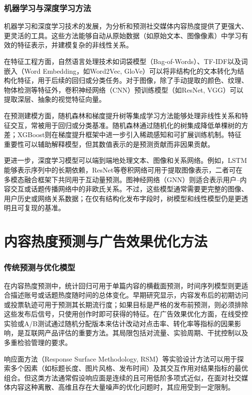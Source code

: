 \subsubsection{机器学习与深度学习方法}
机器学习和深度学习技术的发展，为分析和预测社交媒体内容热度提供了更强大、更灵活的工具。这些方法能够自动从原始数据（如原始文本、图像像素）中学习有效的特征表示，并建模复杂的非线性关系。

在特征工程方面，自然语言处理技术如词袋模型（Bag-of-Words）、TF-IDF以及词嵌入（Word Embedding，如Word2Vec, GloVe）可以将非结构化的文本转化为结构化特征，用于后续的回归或分类任务。对于图像，除了手动提取的颜色、纹理、物体检测等特征外，卷积神经网络（CNN）预训练模型（如ResNet, VGG）可以提取深层、抽象的视觉特征向量。

在预测建模方面，随机森林和梯度提升树等集成学习方法能够处理非线性关系和特征交互，常被用于回归或分类基准。随机森林通过随机化的树集成降低单棵树的方差\cite{Breiman2001}；XGBoost则在梯度提升框架中进一步引入稀疏感知和可扩展训练机制\cite{ChenGuestrin2016}。特征重要性可以辅助解释模型，但其数值表示的是预测贡献而非因果贡献。

更进一步，深度学习模型可以端到端地处理文本、图像和关系网络。例如，LSTM能够表示序列中的长期依赖\cite{HochreiterSchmidhuber1997}，ResNet等卷积网络可用于提取图像表示\cite{HeEtAl2016}，二者可在多模态融合框架下共同用于互动量预测\cite{BaltrusaitisAhujaMorency2019}。图神经网络（GNN）则适合表示用户--内容交互或话题传播网络中的非欧氏关系\cite{WuEtAl2021}。不过，这些模型通常需要更完整的图像、用户历史或网络关系数据；在仅有结构化发布字段时，树模型和线性模型仍是更透明且可复现的基准。

\section{内容热度预测与广告效果优化方法}
\subsubsection{传统预测与优化模型}
在内容热度预测中，统计回归可用于单篇内容的横截面预测，时间序列模型则更适合描述账号或话题热度随时间的总体变化。早期研究显示，内容发布后的初期访问或投票轨迹可用于预测其长期流行度\cite{SzaboHuberman2010}；如果目标是严格的发布前预测，则必须排除这些发布后信号，只使用创作时即可获得的特征。在广告效果优化方面，在线受控实验或A/B测试通过随机分配版本来估计改动对点击率、转化率等指标的因果影响，是互联网产品评估的重要方法\cite{KohaviEtAl2009}。其局限包括对流量、实验周期、干扰控制以及多重检验管理的要求。

响应面方法（Response Surface Methodology, RSM）等实验设计方法可以用于探索多个因素（如标题长度、图片风格、发布时间）及其交互作用对结果指标的最优组合。但这类方法通常假设响应面是连续的且可用低阶多项式近似，在面对社交媒体内容这种离散、高维且存在大量噪声的优化问题时，其应用受到一定限制。
